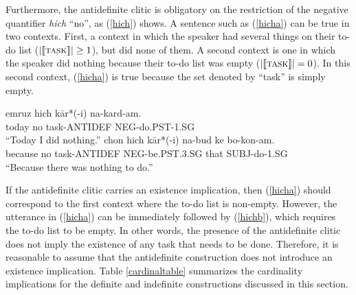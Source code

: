 \documentclass{salt}
\begin{document}
Furthermore, the antidefinite clitic is obligatory on the restriction of the negative quantifier \emph{hich} ``no'', as (\ref{hich}) shows. A sentence such as (\ref{hicha}) can be true in two contexts. First, a context in which the speaker had several things on their to-do list ({\small $| \llbracket \textsc{task} \rrbracket | \geq 1$}), but did none of them. A second context is one in which the speaker did nothing because their to-do list was empty ({\small $| \llbracket \textsc{task} \rrbracket | = 0$}). In this second context, (\ref{hicha}) is true because the set denoted by ``task'' is simply empty. 

	\begin {exe}
	\ex  \label {hich}
		\begin {xlist}
		\ex \label {hicha}
		\gll	emruz	hich 	k\={a}r*(-{\color {blue}i})		na-kard-am.\\
			today	no		task-{\scriptsize ANTIDEF}	{\scriptsize NEG}-do{\scriptsize .PST}-{\scriptsize 1.SG}\\
			``Today I did nothing.''
		\ex \label {hichb}
		\gll	chon		hich 	k\={a}r*(-{\color {blue}i})			na-bud	ke bo-kon-am.\\
			because		no		task-{\scriptsize ANTIDEF}	{\scriptsize NEG}-be{\scriptsize .PST.3.SG} that	{\scriptsize SUBJ}-do-{\scriptsize 1.SG}\\
			``Because there was nothing to do.''
		\end {xlist}
	\end {exe}

If the antidefinite clitic carries an existence implication, then (\ref{hicha}) should correspond to the first context where the to-do list is non-empty. However, the utterance in (\ref{hicha}) can be immediately followed by (\ref{hichb}), which requires the to-do list to be empty. In other words, the presence of the antidefinite clitic does not imply the existence of any task that needs to be done. Therefore, it is reasonable to assume that the antidefinite construction does not introduce an existence implication. Table \ref{cardinaltable} summarizes the cardinality implications for the definite and indefinite constructions discussed in this section.
\end{document}

